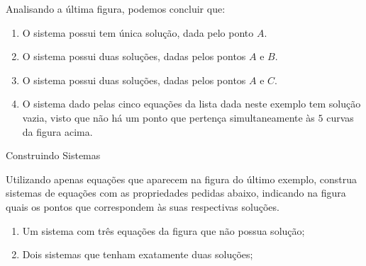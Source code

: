 \needspace{5em}
Analisando a última figura, podemos concluir que:

\begin{enumerate}
\item O sistema  possui tem única solução, dada pelo ponto $A$. 

\item O sistema  possui duas soluções, dadas pelos pontos $A$ e $B$. 

\item O sistema  possui duas soluções, dadas pelos pontos $A$ e $C$.

\item O sistema dado pelas cinco equações da lista dada neste exemplo tem solução vazia, visto que não há um ponto que pertença simultaneamente às $5$ curvas da figura acima.
\end{enumerate}


  

\label{\detokenize{AF107-2:praticando-sistemas-de-equaçoes}}\label{\detokenize{AF107-2::doc}}

\begin{task}{Construindo Sistemas}

Utilizando apenas equações que aparecem na figura do último exemplo, construa sistemas de equações com as propriedades pedidas abaixo, indicando na figura quais os pontos que correspondem às suas respectivas soluções.

\begin{enumerate}
\item{}
Um sistema com três equações da figura que não possua solução;

\item{}
Dois sistemas que tenham exatamente duas soluções;


\end{enumerate}



\end{task}


